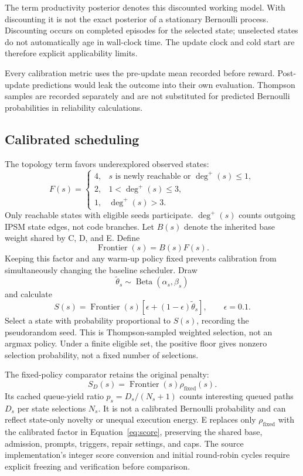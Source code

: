 \documentclass[final,5p,times,number]{elsarticle}
\begin{document}
The term productivity posterior denotes this discounted working model. With discounting it is not the exact posterior of a stationary Bernoulli process. Discounting occurs on completed episodes for the selected state; unselected states do not automatically age in wall-clock time. The update clock and cold start are therefore explicit applicability limits.

Every calibration metric uses the pre-update mean recorded before reward. Post-update predictions would leak the outcome into their own evaluation. Thompson samples are recorded separately and are not substituted for predicted Bernoulli probabilities in reliability calculations.

\subsection{Calibrated scheduling}
The topology term favors underexplored observed states:
\begin{equation}
F(s)=
\begin{cases}
4,&s\text{ is newly reachable or }\deg^+(s)\leq1,\\
2,&1<\deg^+(s)\leq3,\\
1,&\deg^+(s)>3.
\end{cases}
\end{equation}
Only reachable states with eligible seeds participate. $\deg^+(s)$ counts outgoing IPSM state edges, not code branches. Let $B(s)$ denote the inherited base weight shared by C, D, and E. Define
\begin{equation}
\operatorname{Frontier}(s)=B(s)F(s).
\end{equation}
Keeping this factor and any warm-up policy fixed prevents calibration from simultaneously changing the baseline scheduler. Draw
\begin{equation}
\widetilde{\theta}_s\sim\operatorname{Beta}(\alpha_s,\beta_s)
\end{equation}
and calculate
\begin{equation}
S(s)=\operatorname{Frontier}(s)[\epsilon+(1-\epsilon)\widetilde{\theta}_s],
\qquad\epsilon=0.1.
\label{eq:score}
\end{equation}
Select a state with probability proportional to $S(s)$, recording the pseudorandom seed. This is Thompson-sampled weighted selection, not an argmax policy. Under a finite eligible set, the positive floor gives nonzero selection probability, not a fixed number of selections.

The fixed-policy comparator retains the original penalty:
\begin{equation}
S_D(s)=\operatorname{Frontier}(s)\rho_{\mathrm{fixed}}(s).
\end{equation}
Its cached queue-yield ratio $p_s=D_s/(N_s+1)$ counts interesting queued paths $D_s$ per state selections $N_s$. It is not a calibrated Bernoulli probability and can reflect state-only novelty or unequal execution energy. E replaces only $\rho_{\mathrm{fixed}}$ with the calibrated factor in Equation~\ref{eq:score}, preserving the shared base, admission, prompts, triggers, repair settings, and caps. The source implementation's integer score conversion and initial round-robin cycles require explicit freezing and verification before comparison.
\end{document}
